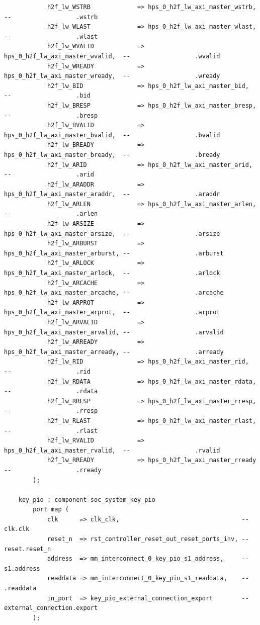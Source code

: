 \documentclass[conference]{IEEEtran}
\begin{document}
\begin{lstlisting}
			h2f_lw_WSTRB             => hps_0_h2f_lw_axi_master_wstrb,   --                  .wstrb
			h2f_lw_WLAST             => hps_0_h2f_lw_axi_master_wlast,   --                  .wlast
			h2f_lw_WVALID            => hps_0_h2f_lw_axi_master_wvalid,  --                  .wvalid
			h2f_lw_WREADY            => hps_0_h2f_lw_axi_master_wready,  --                  .wready
			h2f_lw_BID               => hps_0_h2f_lw_axi_master_bid,     --                  .bid
			h2f_lw_BRESP             => hps_0_h2f_lw_axi_master_bresp,   --                  .bresp
			h2f_lw_BVALID            => hps_0_h2f_lw_axi_master_bvalid,  --                  .bvalid
			h2f_lw_BREADY            => hps_0_h2f_lw_axi_master_bready,  --                  .bready
			h2f_lw_ARID              => hps_0_h2f_lw_axi_master_arid,    --                  .arid
			h2f_lw_ARADDR            => hps_0_h2f_lw_axi_master_araddr,  --                  .araddr
			h2f_lw_ARLEN             => hps_0_h2f_lw_axi_master_arlen,   --                  .arlen
			h2f_lw_ARSIZE            => hps_0_h2f_lw_axi_master_arsize,  --                  .arsize
			h2f_lw_ARBURST           => hps_0_h2f_lw_axi_master_arburst, --                  .arburst
			h2f_lw_ARLOCK            => hps_0_h2f_lw_axi_master_arlock,  --                  .arlock
			h2f_lw_ARCACHE           => hps_0_h2f_lw_axi_master_arcache, --                  .arcache
			h2f_lw_ARPROT            => hps_0_h2f_lw_axi_master_arprot,  --                  .arprot
			h2f_lw_ARVALID           => hps_0_h2f_lw_axi_master_arvalid, --                  .arvalid
			h2f_lw_ARREADY           => hps_0_h2f_lw_axi_master_arready, --                  .arready
			h2f_lw_RID               => hps_0_h2f_lw_axi_master_rid,     --                  .rid
			h2f_lw_RDATA             => hps_0_h2f_lw_axi_master_rdata,   --                  .rdata
			h2f_lw_RRESP             => hps_0_h2f_lw_axi_master_rresp,   --                  .rresp
			h2f_lw_RLAST             => hps_0_h2f_lw_axi_master_rlast,   --                  .rlast
			h2f_lw_RVALID            => hps_0_h2f_lw_axi_master_rvalid,  --                  .rvalid
			h2f_lw_RREADY            => hps_0_h2f_lw_axi_master_rready   --                  .rready
		);

	key_pio : component soc_system_key_pio
		port map (
			clk      => clk_clk,                                  --                 clk.clk
			reset_n  => rst_controller_reset_out_reset_ports_inv, --               reset.reset_n
			address  => mm_interconnect_0_key_pio_s1_address,     --                  s1.address
			readdata => mm_interconnect_0_key_pio_s1_readdata,    --                    .readdata
			in_port  => key_pio_external_connection_export        -- external_connection.export
		);


\end{lstlisting}
\end{document}
